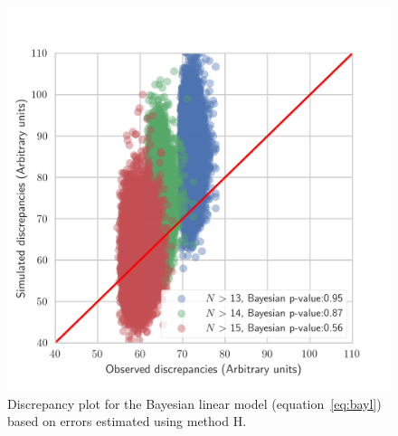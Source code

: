 \documentclass[a4paper,fleqn,usenatbib]{mnras}
\begin{document}
\begin{figure}
	\includegraphics[scale=0.7]{discl.png}
    \caption{Discrepancy plot for the Bayesian linear model (equation~\ref{eq:bayl}) based on errors estimated using method H. }
    \label{fig:discl}
\end{figure}
\end{document}
